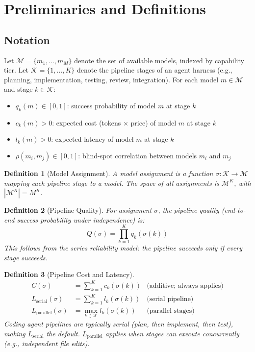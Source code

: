 \documentclass[11pt, a4paper, logo, copyright]{googledeepmind}
\newtheorem{definition}{Definition}[section]
\begin{document}
\section{Preliminaries and Definitions}
\label{sec:prelim}

\subsection{Notation}

Let $\mathcal{M} = \{m_1, \ldots, m_M\}$ denote the set of available models, indexed by capability tier. Let $\mathcal{K} = \{1, \ldots, K\}$ denote the pipeline stages of an agent harness (e.g., planning, implementation, testing, review, integration). For each model $m \in \mathcal{M}$ and stage $k \in \mathcal{K}$:

\begin{itemize}
\item $q_k(m) \in [0,1]$: success probability of model $m$ at stage $k$
\item $c_k(m) > 0$: expected cost (tokens $\times$ price) of model $m$ at stage $k$
\item $l_k(m) > 0$: expected latency of model $m$ at stage $k$
\item $\rho(m_i, m_j) \in [0,1]$: blind-spot correlation between models $m_i$ and $m_j$
\end{itemize}

\begin{definition}[Model Assignment]
A \emph{model assignment} is a function $\sigma: \mathcal{K} \to \mathcal{M}$ mapping each pipeline stage to a model. The space of all assignments is $\mathcal{M}^K$, with $|\mathcal{M}^K| = M^K$.
\end{definition}

\begin{definition}[Pipeline Quality]
For assignment $\sigma$, the pipeline quality (end-to-end success probability under independence) is:
\begin{equation}
Q(\sigma) = \prod_{k=1}^{K} q_k(\sigma(k))
\end{equation}
This follows from the series reliability model: the pipeline succeeds only if every stage succeeds.
\end{definition}

\begin{definition}[Pipeline Cost and Latency]
\begin{align}
C(\sigma) &= \sum_{k=1}^{K} c_k(\sigma(k)) & \text{(additive; always applies)} \\
L_{\mathrm{serial}}(\sigma) &= \sum_{k=1}^{K} l_k(\sigma(k)) & \text{(serial pipeline)} \\
L_{\mathrm{parallel}}(\sigma) &= \max_{k \in \mathcal{K}} l_k(\sigma(k)) & \text{(parallel stages)}
\end{align}
Coding agent pipelines are typically serial (plan, then implement, then test), making $L_{\mathrm{serial}}$ the default. $L_{\mathrm{parallel}}$ applies when stages can execute concurrently (e.g., independent file edits).
\end{definition}
\end{document}
